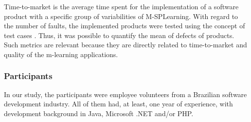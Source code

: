 \begin{table}[h]
%
\end{table}

Time-to-market is the average time spent for the implementation of a software product with a specific group of variabilities of M-SPLearning. With regard to the number of faults, the implemented products were tested using the concept of test cases \cite{craig02}. Thus, it was possible to quantify the mean of defects of products. Such metrics are relevant because they are directly related to time-to-market and quality of the m-learning applications.

\subsubsection{Participants}

In our study, the participants were employee volunteers from a Brazilian software development industry. All of them had, at least, one year of experience, with development background in Java, Microsoft .NET and/or PHP.

